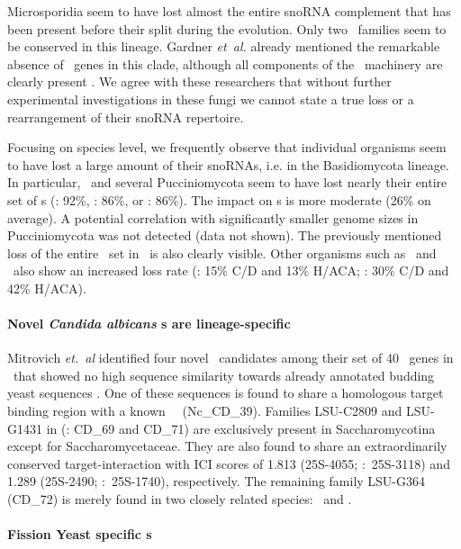 Microsporidia seem to have lost almost the entire snoRNA complement
that has been present before their split during the evolution.  Only
two \cd\ families seem to be conserved in this lineage.  Gardner
\emph{et~al.} already mentioned the remarkable absence of \sno\ genes
in this clade, although all components of the \sno\ machinery are
clearly present \cite{Gardner:2010}.  We agree with these researchers
that without further experimental investigations in these fungi we
cannot state a true loss or a rearrangement of their snoRNA
repertoire.

Focusing on species level, we frequently observe that individual
organisms seem to have lost a large amount of their snoRNAs, i.e. in
the Basidiomycota lineage.  In particular, \wse\ and several
Pucciniomycota seem to have lost nearly their entire set of \haca s
(\wse: 92\%, \rmi: 86\%, or \sli: 86\%). The impact on \cd s is more
moderate (26\% on average). A potential correlation with significantly
smaller genome sizes in Pucciniomycota was not detected (data not
shown). The previously mentioned loss of the entire \haca\ set in
\Ptt\ is also clearly visible. Other organisms such as \pan\ and \opi\
also show an increased loss rate (\pan: 15\% C/D and 13\% H/ACA; \opi:
30\% C/D and 42\% H/ACA).

\paragraph{\textbf{Novel \emph{Candida albicans} \sno s are lineage-specific}}

Mitrovich \emph{et.~al} identified four novel \sno\ candidates among
their set of 40 \sno\ genes in \calb\ that showed no high sequence similarity
towards already annotated budding yeast sequences
\cite{Mitrovich:2010}. One of these sequences is found to share a
homologous target binding region with a known \ncr\ \sno\
(Nc\_CD\_39). Families LSU-C2809 and LSU-G1431 in
\cite{Mitrovich:2010} (\snostrip: CD\_69 and CD\_71) are exclusively
present in Saccharomycotina except for Saccharomycetaceae. They are
also found to share an extraordinarily conserved target-interaction with
ICI scores of 1.813 (25S-4055; \calb:~25S-3118) and 1.289 (25S-2490;
\calb:~25S-1740), respectively. The remaining family LSU-G364 (CD\_72)
is merely found in two closely related species: \cdu\ and \ctr.

\paragraph{\textbf{Fission Yeast specific \sno s}}

